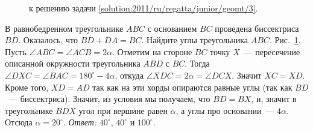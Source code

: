 \ifsolution
\begin{figure}\centering
    \caption{к решению задачи \ref{solution:2011/ru/regatta/junior/geomt/3}.}
    \label{fig:solution:2011/ru/regatta/junior/geomt/3}
\end{figure}
\fi %

\problem
В равнобедренном треугольнике $ABC$ с основанием $BC$ проведена биссектриса
$BD$.
Оказалось, что $BD + DA = BC$.
Найдите углы треугольника $ABC$.
\solution
\label{solution:2011/ru/regatta/junior/geomt/3}%
Рис.~\ref{fig:solution:2011/ru/regatta/junior/geomt/3}.
Пусть $\angle ABC = \angle ACB = 2 \alpha$.
Отметим на стороне $BC$ точку $X$~--- пересечение описанной окружности
треугольника $ABD$ с $BC$.
Тогда
$\angle DXC = \angle BAC = 180^\circ - 4 \alpha$,
откуда $\angle XDC = 2 \alpha = \angle DCX$.
Значит $XC = XD$.
Кроме того, $XD = AD$ так как на эти хорды опираются равные углы
(так как $BD$~--- биссектриса).
Значит, из условия мы получаем, что $BD = BX$, и, значит в треугольнике $BDX$
угол при вершине равен $\alpha$, а углы про основании~--- $4 \alpha$.
Отсюда $\alpha = 20^\circ$.
\emph{Ответ:}
$40^\circ$, $40^\circ$ и $100^\circ$.
\endproblem

